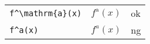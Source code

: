 \documentclass[preview]{standalone}
\newcommand{\tA}[1]{\textcolor{cA}{#1}}
\newcommand{\tD}[1]{\textcolor{cD}{#1}}
\begin{document}
\begin{table}[H]
    \centering
    \begin{tabular}{lll}
        \verb|f^\mathrm{a}(x)| & $f^{\mathrm{a}}(x)$ & \tA{ok} \\
        \verb|f^a(x)|          & $f^a(x)$            & \tD{ng} \\
    \end{tabular}
\end{table}
\end{document}
